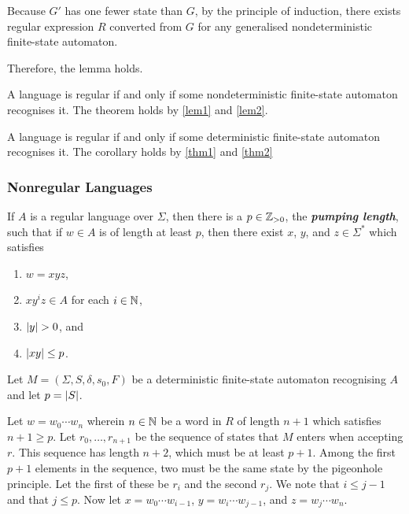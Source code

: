     Because \(G'\) has one fewer state than \(G\), by the principle of
    induction, there exists regular expression \(R\) converted from \(G\) for
    any generalised nondeterministic finite-state automaton.

    Therefore, the lemma holds.
\Epr

\Bth
    \label{thm2}
    A language is regular if and only if some nondeterministic finite-state
    automaton recognises it.
\Eth
\Bpr
    The theorem holds by \autoref{lem1} and \autoref{lem2}.
\Epr

\Bcr
    A language is regular if and only if some deterministic finite-state
    automaton recognises it.
\Ecr
\Bpr
    The corollary holds by \autoref{thm1} and \autoref{thm2}
\Epr

\subsubsection{Nonregular Languages}

    If \(A\) is a regular language over \(\Sigma\), then there is a \(p \in
    \mathbb{Z}_{>0}\), the \textbf{\textit{pumping length}}, such that if \(w \in A\) is
    of length at least \(p\), then there exist \(x\), \(y\), and \(z \in
    \Sigma^*\) which satisfies
    \begin{enumerate}
        \item \(w = x y z\),
        \item \(x y^i z \in A\) for each \(i \in \mathbb{N}\),
        \item \(\lvert y\rvert > 0\), and
        \item \(\lvert x y \rvert \leq p\).
    \end{enumerate}
\Eth
\Bpr
    Let \(M = (\Sigma, S, \delta, s_0, F)\) be a deterministic finite-state
    automaton recognising \(A\) and let \(p = \lvert S\rvert\).

    Let \(w = w_0 \cdots w_n\) wherein \(n \in \mathbb{N}\) be a word in \(R\) of
    length \(n + 1\) which satisfies \(n + 1 \geq p\). Let \(r_0, \ldots, r_{n +
    1}\) be the sequence of states that \(M\) enters when accepting \(r\). This
    sequence has length \(n + 2\), which must be at least \(p + 1\). Among the
    first \(p + 1\) elements in the sequence, two must be the same state by the
    pigeonhole principle. Let the first of these be \(r_i\) and the second
    \(r_j\). We note that \(i \leq j - 1\) and that \(j \leq p\). Now let \(x =
    w_0 \cdots w_{i - 1}\), \(y = w_i \cdots w_{j - 1}\), and \(z = w_j \cdots
    w_n\).

